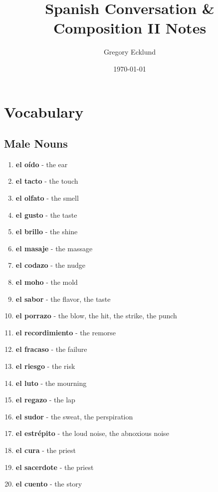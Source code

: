 \documentclass[12pt]{article}
\title{Spanish Conversation \& Composition II Notes}
\author{Gregory Ecklund}
\date{\today}
\begin{document}
    \maketitle
    \tableofcontents
    \newpage

    \section{Vocabulary}
        \subsection{Male Nouns}
            \begin{enumerate}
                \item \textbf{el oído} - the ear
                \item \textbf{el tacto} - the touch
                \item \textbf{el olfato} - the smell
                \item \textbf{el gusto} - the taste
                \item \textbf{el brillo} - the shine
                \item \textbf{el masaje} - the massage
                \item \textbf{el codazo} - the nudge
                \item \textbf{el moho} - the mold
                \item \textbf{el sabor} - the flavor, the taste
                \item \textbf{el porrazo} - the blow, the hit, the strike, the punch
                \item \textbf{el recordimiento} - the remorse
                \item \textbf{el fracaso} - the failure
                \item \textbf{el riesgo} - the risk
                \item \textbf{el luto} - the mourning
                \item \textbf{el regazo} - the lap
                \item \textbf{el sudor} - the sweat, the perspiration
                \item \textbf{el estrépito} - the loud noise, the abnoxious noise
                \item \textbf{el cura} - the priest
                \item \textbf{el sacerdote} - the priest
                \item \textbf{el cuento} - the story

\end{enumerate}
\end{document}
